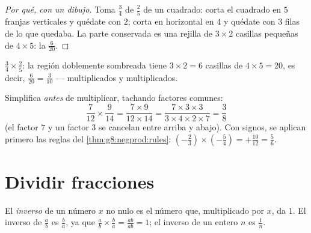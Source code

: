 \begin{proof}[Por qué, con un dibujo]
Toma $\frac34$ de $\frac25$ de un cuadrado: corta el cuadrado en $5$
franjas verticales y quédate con $2$; corta en horizontal en $4$ y quédate con $3$
filas de lo que quedaba. La parte conservada es una rejilla de $3 \times 2$ casillas
pequeñas de $4 \times 5$: la  $\frac{6}{20}$.
\end{proof}

\begin{omfigure}

{\small $\frac34 \times \frac25$: la región doblemente sombreada tiene
$3 \times 2 = 6$ casillas de $4 \times 5 = 20$, es decir,
$\frac{6}{20} = \frac{3}{10}$ ---  multiplicados y 
multiplicados.}
\end{omfigure}

\begin{example}\label{ex:g8:fractions:mult}
Simplifica \emph{antes} de multiplicar, tachando factores comunes:
\[
\frac{7}{12} \times \frac{9}{14}
= \frac{7 \times 9}{12 \times 14}
= \frac{7 \times 3 \times 3}{3 \times 4 \times 2 \times 7}
= \frac{3}{8}
\]
(el factor $7$ y un factor $3$ se cancelan entre arriba y abajo).
Con signos, se aplican primero las reglas del \cref{thm:g8:negprod:rules}:
$\left(-\frac23\right) \times \left(-\frac{5}{4}\right) =
+\frac{10}{12} = \frac56$.
\end{example}

\section{Dividir fracciones}

\begin{definition}[Inverso]\label{def:g8:fractions:inverse}
El \emph{inverso} de un número $x$ no nulo es el
número que, multiplicado por $x$, da $1$. El inverso de
$\frac ab$ es $\frac ba$, ya que
$\frac ab \times \frac ba = \frac{ab}{ab} = 1$; el inverso de un
entero $n$ es $\frac1n$.
\end{definition}

